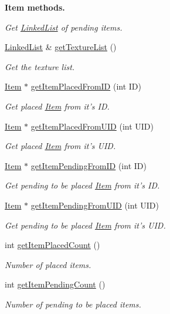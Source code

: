 \begin{Indent}{\bf Item methods.}
\begin{DoxyCompactItemize}
\begin{DoxyCompactList}\small\item\em Get \hyperlink{classLinkedList}{Linked\-List} of pending items. \end{DoxyCompactList}\item 
\hyperlink{classLinkedList}{Linked\-List} \& \hyperlink{classShipMaster_a4095febdcd811f31f8af7e512cc30962}{get\-Texture\-List} ()
\begin{DoxyCompactList}\small\item\em Get the texture list. \end{DoxyCompactList}\item 
\hyperlink{classItem}{Item} $\ast$ \hyperlink{classShipMaster_a4e343f85e8732b670e37eb10793b9da5}{get\-Item\-Placed\-From\-I\-D} (int I\-D)
\begin{DoxyCompactList}\small\item\em Get placed \hyperlink{classItem}{Item} from it's I\-D. \end{DoxyCompactList}\item 
\hyperlink{classItem}{Item} $\ast$ \hyperlink{classShipMaster_aa6014ba22783d814119df0b8a45f4a3b}{get\-Item\-Placed\-From\-U\-I\-D} (int U\-I\-D)
\begin{DoxyCompactList}\small\item\em Get placed \hyperlink{classItem}{Item} from it's U\-I\-D. \end{DoxyCompactList}\item 
\hyperlink{classItem}{Item} $\ast$ \hyperlink{classShipMaster_a49034c4d14496165dafa091998f9ed92}{get\-Item\-Pending\-From\-I\-D} (int I\-D)
\begin{DoxyCompactList}\small\item\em Get pending to be placed \hyperlink{classItem}{Item} from it's I\-D. \end{DoxyCompactList}\item 
\hyperlink{classItem}{Item} $\ast$ \hyperlink{classShipMaster_af65799a876a14901fdb2e385a35b32b2}{get\-Item\-Pending\-From\-U\-I\-D} (int U\-I\-D)
\begin{DoxyCompactList}\small\item\em Get pending to be placed \hyperlink{classItem}{Item} from it's U\-I\-D. \end{DoxyCompactList}\item 
int \hyperlink{classShipMaster_a46e23864a829801068f1e1a9fca0ef82}{get\-Item\-Placed\-Count} ()
\begin{DoxyCompactList}\small\item\em Number of placed items. \end{DoxyCompactList}\item 
int \hyperlink{classShipMaster_a3581bacb31233e22e0ae5c372b4bdb7c}{get\-Item\-Pending\-Count} ()
\begin{DoxyCompactList}\small\item\em Number of pending to be placed items. \end{DoxyCompactList}\end{DoxyCompactItemize}
\end{Indent}
